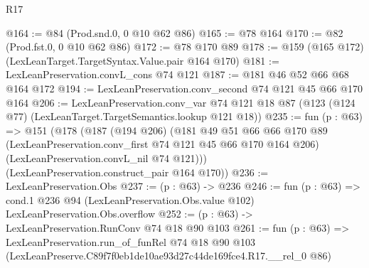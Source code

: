 \begin{lexlean}{R17}
\begin{coremodule}
@164 := @84 (Prod.snd.{0, 0} @10 @62 @86)
@165 := @78 @164
@170 := @82 (Prod.fst.{0, 0} @10 @62 @86)
@172 := @78 @170 @89
@178 := @159 (@165 @172) (LexLeanTarget.TargetSyntax.Value.pair @164 @170)
@181 := LexLeanPreservation.convL_cons @74 @121
@187 := @181 @46 @52 @66 @68 @164 @172
@194 := LexLeanPreservation.conv_second @74 @121 @45 @66 @170 @164
@206 := LexLeanPreservation.conv_var
    @74
    @121
    @18
    @87
    (@123 (@124 @77) (LexLeanTarget.TargetSemantics.lookup @121 @18))
@235 := fun (p : @63) =>
  @151
    (@178
      (@187
        (@194 @206)
        (@181
          @49
          @51
          @66
          @66
          @170
          @89
          (LexLeanPreservation.conv_first @74 @121 @45 @66 @170 @164 @206)
          (LexLeanPreservation.convL_nil @74 @121)))
      (LexLeanPreservation.construct_pair @164 @170))
@236 := LexLeanPreservation.Obs
@237 := (p : @63) -> @236
@246 := fun (p : @63) =>
  cond.{1} @236 @94 (LexLeanPreservation.Obs.value @102) LexLeanPreservation.Obs.overflow
@252 := (p : @63) -> LexLeanPreservation.RunConv @74 @18 @90 @103
@261 := fun (p : @63) =>
  LexLeanPreservation.run_of_funRel
    @74
    @18
    @90
    @103
    (LexLeanPreserve.C89f7f0eb1de10ae93d27c44de169fce4.R17.__rel_0 @86)
\end{coremodule}
\end{lexlean}
